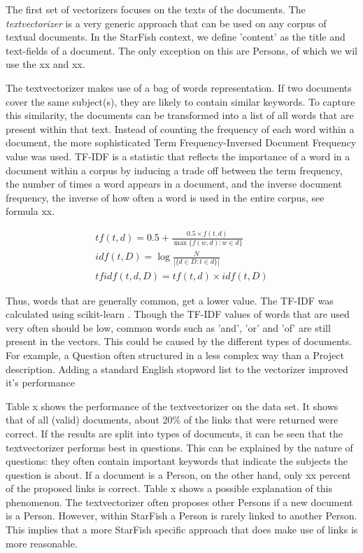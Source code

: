 The first set of vectorizers focuses on the texts of the documents. The \emph{textvectorizer} is a very generic approach that can be used on any corpus of textual documents. In the StarFish context, we define 'content' as the title and text-fields of a document. The only exception on this are Persons, of which we wil use the xx and xx. 

The textvectorizer makes use of a bag of words representation. If two documents cover the same subject(s), they are likely to contain similar keywords. To capture this similarity, the documents can be transformed into a list of all words that are present within that text. Instead of counting the frequency of each word within a document, the more sophisticated Term Frequency-Inversed Document Frequency value was used. TF-IDF is a statistic that reflects the importance of a word in a document within a corpus by inducing a trade off between the term frequency, the number of times a word appears in a document, and the inverse document frequency, the inverse of how often a word is used in the entire corpus, see formula xx. 

\begin{align}
\nonumber {tf}(t,d) = 0.5 + \frac{0.5 \times {f}(t, d)}{\max\{{f}(w, d):w \in d\}}\\
\nonumber {idf}(t, D) =  \log \frac{N}{|\{d \in D: t \in d\}|}\\
\nonumber {tfidf}(t,d,D) = {tf}(t,d) \times {idf}(t, D)
\end{align}

Thus, words that are generally common, get a lower value. The TF-IDF was calculated using scikit-learn \citep{scikit-learn}.  Though the TF-IDF values of words that are used very often should be low, common words such as 'and', 'or' and 'of' are still present in the vectors. This could be caused by the different types of documents. For example, a Question often structured in a less complex way than a Project description. Adding a standard English stopword list to the vectorizer improved it's performance %

Table x shows the performance of the textvectorizer on the data set. It shows that of all (valid) documents, about 20\% of the links that were returned were correct. If the results are split into types of documents, it can be seen that the textvectorizer performs best in questions. This can be explained by the nature of questions: they often contain important keywords that indicate the subjects the question is about. If a document is a Person, on the other hand, only xx percent of the proposed links is correct. Table x shows a possible explanation of this phenomenon. The textvectorizer often proposes other Persons if a new document is a Person. However, within StarFish a Person is rarely linked to another Person. This implies that a more StarFish specific approach that does make use of links is more reasonable. 

